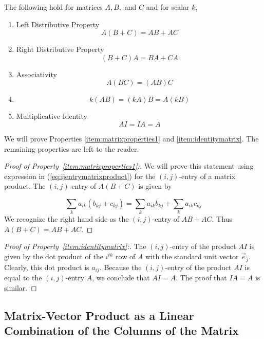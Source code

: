 \documentclass{ximera}
\begin{document}
\begin{theorem}\label{th:propertiesofmatrixmultiplication}
The following hold for matrices $A,B,$ and $C$ and for scalar $k$,
\begin{enumerate}
\item \label{item:matrixproperties1} Left Distributive Property
$$A\left( B+C\right) =AB +AC$$
\item\label{item:matrixproperties2} Right Distributive Property
$$\left( B+C\right) A=BA+CA$$
\item \label{item:matrixproperties3} Associativity
$$A\left( BC\right) =\left( AB\right) C$$
\item\label{item:matrixproperties4}
$$k(AB)=(kA)B=A(kB)$$
\item \label{item:identitymatrix} Multiplicative Identity
$$AI=IA=A$$
\end{enumerate}
\end{theorem}
We will prove Properties \ref{item:matrixproperties1} and \ref{item:identitymatrix}.  The remaining properties are left to the reader.
\begin{proof}[Proof of Property~\ref{item:matrixproperties1}:]
We will prove this statement using expression in (\ref{eq:ijentrymatrixproduct}) for the $(i,j)$-entry of a matrix product. The $(i,j)$-entry of $A(B+C)$ is given by

$$
\sum_{k}a_{ik}( b_{kj}+c_{kj})=\sum_{k}a_{ik}b_{kj}+\sum_{k}a_{ik}c_{kj}
$$
We recognize the right hand side as the $(i,j)$-entry of $AB+AC$.
Thus $A(B+C) =AB+AC$. 
\end{proof}
\begin{proof}[Proof of Property~\ref{item:identitymatrix}:]
The $(i,j)$-entry of the product $AI$ is given by the dot product of the $i^{th}$ row of $A$ with the standard unit vector $\vec{e}_j$.  Clearly, this dot product is $a_{ij}$.  Because the $(i,j)$-entry of the product $AI$ is equal to the $(i,j)$-entry $A$, we conclude that $AI=A$.  The proof that $IA=A$ is similar.
\end{proof}

\subsection*{Matrix-Vector Product as a Linear Combination of the Columns of the Matrix}
\end{document}
